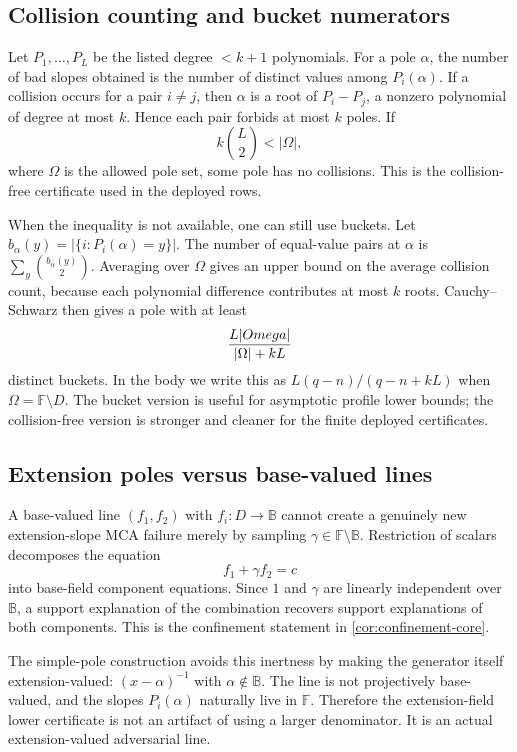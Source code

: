 \documentclass[11pt]{article}
\theoremstyle{definition}
\theoremstyle{remark}
\newcommand{\F}{\mathbb F}
\newcommand{\BB}{\mathbb B}
\begin{document}
\subsection{Collision counting and bucket numerators}\label{appsub:pole-buckets}

Let \(P_1,\ldots,P_L\) be the listed degree \(<k+1\) polynomials.  For a pole \(\alpha\), the number of bad slopes obtained is the number of distinct values among \(P_i(\alpha)\).  If a collision occurs for a pair \(i\ne j\), then \(\alpha\) is a root of \(P_i-P_j\), a nonzero polynomial of degree at most \(k\).  Hence each pair forbids at most \(k\) poles.  If
\[
        k\binom L2<|\Omega|,
\]
where \(\Omega\) is the allowed pole set, some pole has no collisions.  This is the collision-free certificate used in the deployed rows.

When the inequality is not available, one can still use buckets.  Let \(b_\alpha(y)=|\{i:P_i(\alpha)=y\}|\).  The number of equal-value pairs at \(\alpha\) is \(\sum_y\binom{b_\alpha(y)}2\).  Averaging over \(\Omega\) gives an upper bound on the average collision count, because each polynomial difference contributes at most \(k\) roots.  Cauchy--Schwarz then gives a pole with at least
\[
        \frac{L|\\Omega|}{|
        \Omega|+kL}
\]
distinct buckets.  In the body we write this as \(L(q-n)/(q-n+kL)\) when \(\Omega=\F\setminus D\).  The bucket version is useful for asymptotic profile lower bounds; the collision-free version is stronger and cleaner for the finite deployed certificates.

\subsection{Extension poles versus base-valued lines}\label{appsub:extension-pitfall}

A base-valued line \((f_1,f_2)\) with \(f_i:D\to\BB\) cannot create a genuinely new extension-slope MCA failure merely by sampling \(\gamma\in\F\setminus\BB\).  Restriction of scalars decomposes the equation
\[
        f_1+
        \gamma f_2=c
\]
into base-field component equations.  Since \(1\) and \(\gamma\) are linearly independent over \(\BB\), a support explanation of the combination recovers support explanations of both components.  This is the confinement statement in \cref{cor:confinement-core}.

The simple-pole construction avoids this inertness by making the generator itself extension-valued: \((x-\alpha)^{-1}\) with \(\alpha\notin\BB\).  The line is not projectively base-valued, and the slopes \(P_i(\alpha)\) naturally live in \(\F\).  Therefore the extension-field lower certificate is not an artifact of using a larger denominator.  It is an actual extension-valued adversarial line.
\end{document}
